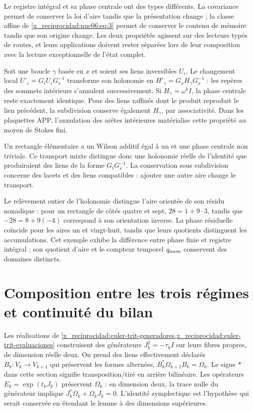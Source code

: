 Le registre intégral et sa phase centrale ont des types différents. La covariance permet de conserver la loi d’aire tandis que la présentation change ; la classe affine de \eqref{x_reciprocidad:nuc06:eq:3} permet de conserver le contenu de mémoire tandis que son origine change. Les deux propriétés agissent sur des lecteurs typés de routes, et leurs applications doivent rester séparées lors de leur composition avec la lecture exceptionnelle de l’état complet.

\begin{proposition}

Soit une boucle \(\gamma\) basée en \(x\) et soient ses liens inversibles \(U_\epsilon\). Le changement local \(U'_\epsilon=G_tU_\epsilon G_s^{-1}\) transforme son holonomie en \(H'_\gamma=G_xH_\gamma G_x^{-1}\) : les repères des sommets intérieurs s’annulent successivement. Si \(H_\gamma=\omega^kI\), la phase centrale reste exactement identique. Pour des liens raffinés dont le produit reproduit le lien précédent, la subdivision conserve également \(H_\gamma\), par associativité. Dans les plaquettes APP, l’annulation des arêtes intérieures matérialise cette propriété au moyen de Stokes fini.
\end{proposition}

Un rectangle élémentaire a un Wilson additif égal à un et une phase centrale non triviale. Ce transport mixte distingue donc une holonomie réelle de l’identité que produiraient des liens de la forme \(G_tG_s^{-1}\). La conservation sous subdivision concerne des lacets et des liens compatibles : ajouter une autre aire change le transport.

Le relèvement entier de l’holonomie distingue l’aire orientée de son résidu nonadique : pour un rectangle de côtés quatre et sept, \(28=1+9\cdot3\), tandis que \(-28=8+9(-4)\) correspond à son orientation inverse. La phase résiduelle coïncide pour les aires un et vingt-huit, tandis que leurs quotients distinguent les accumulations. Cet exemple exhibe la différence entre phase finie et registre intégral ; son quotient d’aire et le compteur temporel \(q_{\rm mem}\) conservent des domaines distincts.

\section{Composition entre les trois régimes et continuité du bilan}

Les réalisations de \cref{x_reciprocidad:euler-trit-generadores,x_reciprocidad:euler-trit-evaluaciones} construisent des générateurs \(J_k^2=-\tau_kI\) sur leurs fibres propres, de dimension réelle deux. On prend des liens effectivement déclarés \(B_k:V_k\to V_{k+1}\) qui préservent les formes alternées, \(B_k^*\Omega_{k+1}B_k=\Omega_k\). Le signe \(*\) dans cette section signifie transposition/tiré en arrière bilinéaire. Les opérateurs \(E_k=\exp(t_kJ_k)\) préservent \(\Omega_k\) : en dimension deux, la trace nulle du générateur implique \(J_k^*\Omega_k+\Omega_kJ_k=0\). L’identité symplectique est l’hypothèse qui serait conservée en étendant le lemme à des dimensions supérieures.

